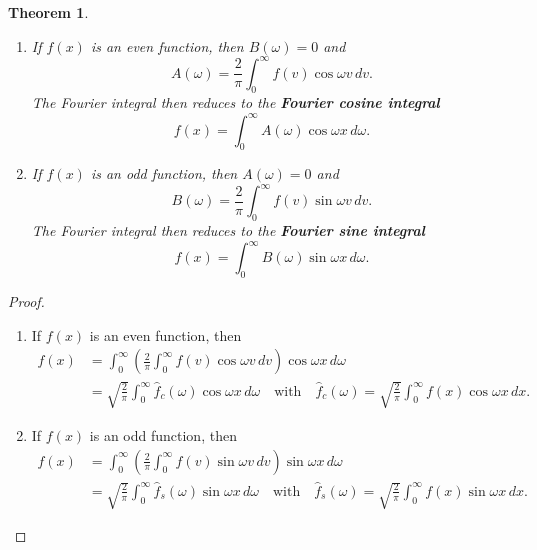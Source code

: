\documentclass[12pt,openany]{book}
\newtheorem{theorem}{Theorem}[chapter]
\theoremstyle{definition}
\begin{document}
	\newpage
	\begin{tcolorbox}[colframe=thmcolor, title={\color{white}\bf Fourier Sine and Cosine Integrals}]
		\begin{theorem}
			\begin{enumerate}[(1)]
				\item If \( f(x) \) is an even function, then \( B(\omega) = 0 \) and
				\[
				A(\omega) = \frac{2}{\pi} \int_{0}^{\infty} f(v) \cos \omega v \, dv.
				\]
				The Fourier integral then reduces to the \textbf{Fourier cosine integral}
				\[
				f(x) = \int_{0}^{\infty} A(\omega) \cos \omega x \, d\omega.
				\]
				
				\item If \( f(x) \) is an odd function, then \( A(\omega) = 0 \) and
				\[
				B(\omega) = \frac{2}{\pi} \int_{0}^{\infty} f(v) \sin \omega v \, dv.
				\]
				The Fourier integral then reduces to the \textbf{Fourier sine integral}
				\[
				f(x) = \int_{0}^{\infty} B(\omega) \sin \omega x \, d\omega.
				\]
			\end{enumerate}
		\end{theorem}
	\end{tcolorbox}
	\begin{proof}
		\begin{enumerate}[(1)]
			\item If \( f(x) \) is an even function, then
			\begin{align*}
				f(x) &= \int_{0}^{\infty} \left( \frac{2}{\pi} \int_{0}^{\infty} f(v) \cos \omega v \, dv \right) \cos \omega x \, d\omega\\
				&= \sqrt{\frac{2}{\pi}} \int_{0}^{\infty} \hat{f}_c(\omega) \cos \omega x \, d\omega\quad\text{with}\quad \hat{f}_c(\omega)=\sqrt{\frac{2}{\pi}} \int_{0}^{\infty} f(x) \cos \omega x \, dx.
			\end{align*}
			\item If \( f(x) \) is an odd function, then
			\begin{align*}
				f(x) &= \int_{0}^{\infty} \left( \frac{2}{\pi} \int_{0}^{\infty} f(v) \sin \omega v \, dv \right) \sin \omega x \, d\omega\\
				&= \sqrt{\frac{2}{\pi}} \int_{0}^{\infty} \hat{f}_s(\omega) \sin \omega x \, d\omega\quad\text{with}\quad\hat{f}_s(\omega) = \sqrt{\frac{2}{\pi}} \int_{0}^{\infty} f(x) \sin \omega x \, dx.
			\end{align*}
		\end{enumerate}
	\end{proof}
\end{document}
